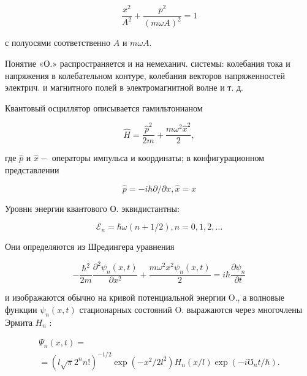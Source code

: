 \documentclass[10pt]{article}
\begin{document}
\[

\frac{x^{2}}{A^{2}}+\frac{p^{2}}{(m \omega A)^{2}}=1

\]



с полуосями соответственно $A$ и $m \omega A$.



Понятие «О.» распространяется и на немеханич. системы: колебания тока и напряжения в колебательном контуре, колебания векторов напряженностей электрич. и магнитного полей в электромагнитной волне и т. д.



Квантовый осциллятор описывается гамильтонианом



\[

\hat{H}=\frac{\hat{p}^{2}}{2 m}+\frac{m \omega^{2} \hat{x}^{2}}{2},

\]



где $\hat{p}$ и $\hat{x}-$ операторы импульса и координаты; в конфигурационном представлении



\[

\hat{p}=-i \hbar \partial / \partial x, \hat{x}=x

\]



Уровни энергии квантового О. эквидистантны:



\[

\mathscr{E}_{n}=\hbar \omega(n+1 / 2), n=0,1,2, \ldots

\]



Они определяются из Шредингера уравнения



\[

-\frac{\hbar^{2}}{2 m} \frac{\partial^{2} \psi_{n}(x, t)}{\partial x^{2}}+\frac{m \omega^{2} x^{2} \psi_{n}(x, t)}{2}=i \hbar \frac{\partial \psi_{n}}{\partial t}

\]



и изображаются обычно на кривой потенциальной энергии O., а волновые функции $\psi_{n}(x, t)$ стационарных состояний O. выражаются через многочлены Эрмита $H_{n}$ :



\[

\begin{gathered}

\Psi_{n}(x, t)= \\

=\left(l \sqrt{\pi} 2^{n} n !\right)^{-1 / 2} \exp \left(-x^{2} / 2 l^{2}\right) H_{n}(x / l) \exp \left(-i \mho_{n} t / \hbar\right) .

\end{gathered}

\]
\end{document}
